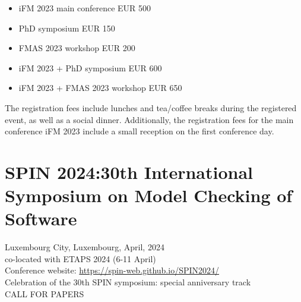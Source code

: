 \documentclass[prodmode,acmtecs]{acmsmall} %
\begin{document}
\begin{itemize}
\begin{itemize}\item  iFM 2023 main conference        EUR 500
\item  PhD symposium                   EUR 150
\item  FMAS 2023 workshop              EUR 200
\item  iFM 2023 + PhD symposium        EUR 600
\item  iFM 2023 + FMAS 2023 workshop   EUR 650
\end{itemize} 
  The registration fees include lunches and tea/coffee breaks during the registered event, as well as a social dinner. Additionally, the registration fees for the main conference iFM 2023 include a small reception on the first conference day.  
 
\end{itemize}\section{SPIN 2024:30th International Symposium on Model Checking of Software}\label{SPIN2024}  Luxembourg City, Luxembourg, April, 2024\\ 
  co-located with ETAPS 2024 (6-11 April)\\ 
  Conference website: \href{https://spin-web.github.io/SPIN2024/}{https://spin-web.github.io/SPIN2024/}\\ 
  Celebration of the 30th SPIN symposium: special anniversary track\\ 
CALL FOR PAPERS 
\end{document}

